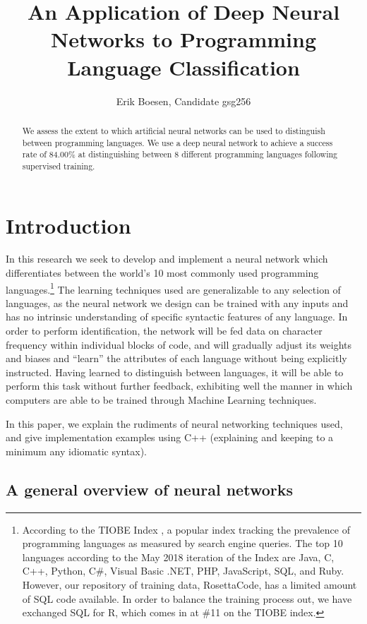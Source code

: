 \documentclass{article}
\begin{document}
\title{An Application of Deep Neural Networks to Programming Language Classification}
\author{Erik Boesen, Candidate gsg256}
\maketitle

\begin{abstract}
We assess the extent to which artificial neural networks can be used to distinguish between programming languages. We use a deep neural network to achieve a success rate of 84.00\% at distinguishing between 8 different programming languages following supervised training.
\end{abstract}

\section{Introduction}
In this research we seek to develop and implement a neural network which differentiates between the world's 10 most commonly used programming languages.\footnote{According to the TIOBE Index \cite{tiobe}, a popular index tracking the prevalence of programming languages as measured by search engine queries. The top 10 languages according to the May 2018 iteration of the Index are Java, C, C++, Python, C\#, Visual Basic .NET, PHP, JavaScript, SQL, and Ruby. However, our repository of training data, RosettaCode, has a limited amount of SQL code available. In order to balance the training process out, we have exchanged SQL for R, which comes in at \#11 on the TIOBE index.} The learning techniques used are generalizable to any selection of languages, as the neural network we design can be trained with any inputs and has no intrinsic understanding of specific syntactic features of any language. In order to perform identification, the network will be fed data on character frequency within individual blocks of code, and will gradually adjust its weights and biases and ``learn'' the attributes of each language without being explicitly instructed. Having learned to distinguish between languages, it will be able to perform this task without further feedback, exhibiting well the manner in which computers are able to be trained through Machine Learning techniques.

In this paper, we explain the rudiments of neural networking techniques used, and give implementation examples using C++ (explaining and keeping to a minimum any idiomatic syntax).

\subsection{A general overview of neural networks}
\end{document}
